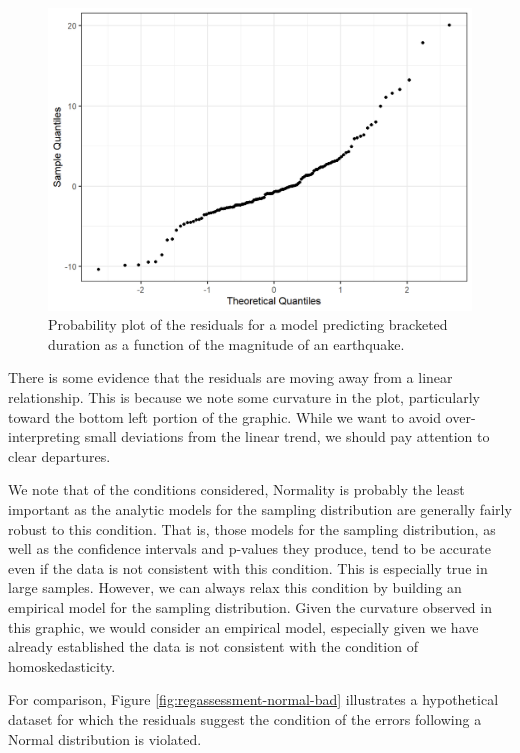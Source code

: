 \documentclass[
]{book}
\theoremstyle{plain}
\theoremstyle{mydefn}
\theoremstyle{myexmpl}
\theoremstyle{remark}
\begin{document}
\begin{figure}

{\centering \includegraphics[width=0.8\linewidth]{./Images/regassessment-normal-1} 

}

\caption{Probability plot of the residuals for a model predicting bracketed duration as a function of the magnitude of an earthquake.}\label{fig:regassessment-normal}
\end{figure}

There is some evidence that the residuals are moving away from a linear relationship. This is because we note some curvature in the plot, particularly toward the bottom left portion of the graphic. While we want to avoid over-interpreting small deviations from the linear trend, we should pay attention to clear departures.

We note that of the conditions considered, Normality is probably the least important as the analytic models for the sampling distribution are generally fairly robust to this condition. That is, those models for the sampling distribution, as well as the confidence intervals and p-values they produce, tend to be accurate even if the data is not consistent with this condition. This is especially true in large samples. However, we can always relax this condition by building an empirical model for the sampling distribution. Given the curvature observed in this graphic, we would consider an empirical model, especially given we have already established the data is not consistent with the condition of homoskedasticity.

For comparison, Figure \ref{fig:regassessment-normal-bad} illustrates a hypothetical dataset for which the residuals suggest the condition of the errors following a Normal distribution is violated.
\end{document}
